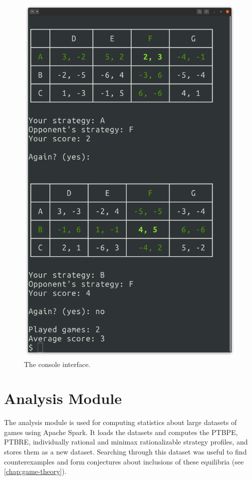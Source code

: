 \begin{figure}
	\centering
	\includegraphics[width=12cm]{fig/console.png}
	\caption{The console interface.}
	\label{fig:console-screen}
\end{figure}

\section{Analysis Module}
The analysis module is used for computing statistics about large datasets of games using Apache Spark.
It loads the datasets and computes the PTBPE, PTBRE, individually rational and minimax rationalizable strategy profiles, and stores them as a new dataset.
Searching through this dataset was useful to find counterexamples and form conjectures about inclusions of these equilibria (see \autoref{chap:game-theory}).
